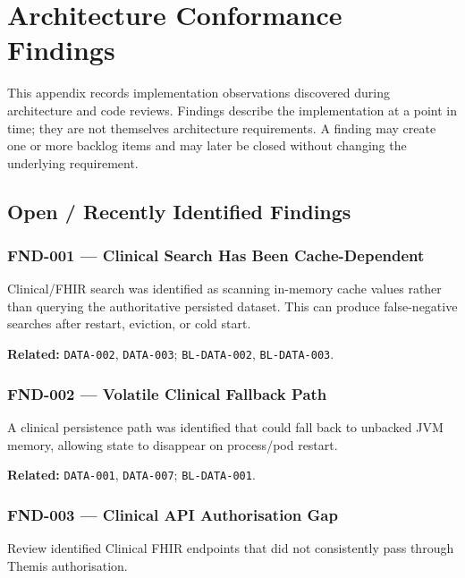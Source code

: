
\chapter{Architecture Conformance Findings}
\label{app:findings}

This appendix records implementation observations discovered during architecture and code reviews. Findings describe the implementation at a point in time; they are not themselves architecture requirements. A finding may create one or more backlog items and may later be closed without changing the underlying requirement.

\section{Open / Recently Identified Findings}

\subsection{FND-001 --- Clinical Search Has Been Cache-Dependent}
Clinical/FHIR search was identified as scanning in-memory cache values rather than querying the authoritative persisted dataset. This can produce false-negative searches after restart, eviction, or cold start.

\textbf{Related:} \texttt{DATA-002}, \texttt{DATA-003}; \texttt{BL-DATA-002}, \texttt{BL-DATA-003}.

\subsection{FND-002 --- Volatile Clinical Fallback Path}
A clinical persistence path was identified that could fall back to unbacked JVM memory, allowing state to disappear on process/pod restart.

\textbf{Related:} \texttt{DATA-001}, \texttt{DATA-007}; \texttt{BL-DATA-001}.

\subsection{FND-003 --- Clinical API Authorisation Gap}
Review identified Clinical FHIR endpoints that did not consistently pass through Themis authorisation.

